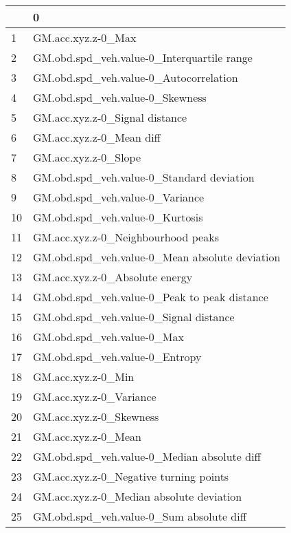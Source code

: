 \begin{tabular}{ll}
\toprule
{} &                                                 0 \\
\midrule
1  &                                GM.acc.xyz.z-0\_Max \\
2  &        GM.obd.spd\_veh.value-0\_Interquartile range \\
3  &            GM.obd.spd\_veh.value-0\_Autocorrelation \\
4  &                   GM.obd.spd\_veh.value-0\_Skewness \\
5  &                    GM.acc.xyz.z-0\_Signal distance \\
6  &                          GM.acc.xyz.z-0\_Mean diff \\
7  &                              GM.acc.xyz.z-0\_Slope \\
8  &         GM.obd.spd\_veh.value-0\_Standard deviation \\
9  &                   GM.obd.spd\_veh.value-0\_Variance \\
10 &                   GM.obd.spd\_veh.value-0\_Kurtosis \\
11 &                GM.acc.xyz.z-0\_Neighbourhood peaks \\
12 &    GM.obd.spd\_veh.value-0\_Mean absolute deviation \\
13 &                    GM.acc.xyz.z-0\_Absolute energy \\
14 &      GM.obd.spd\_veh.value-0\_Peak to peak distance \\
15 &            GM.obd.spd\_veh.value-0\_Signal distance \\
16 &                        GM.obd.spd\_veh.value-0\_Max \\
17 &                    GM.obd.spd\_veh.value-0\_Entropy \\
18 &                                GM.acc.xyz.z-0\_Min \\
19 &                           GM.acc.xyz.z-0\_Variance \\
20 &                           GM.acc.xyz.z-0\_Skewness \\
21 &                               GM.acc.xyz.z-0\_Mean \\
22 &       GM.obd.spd\_veh.value-0\_Median absolute diff \\
23 &            GM.acc.xyz.z-0\_Negative turning points \\
24 &          GM.acc.xyz.z-0\_Median absolute deviation \\
25 &          GM.obd.spd\_veh.value-0\_Sum absolute diff \\

\end{tabular}
